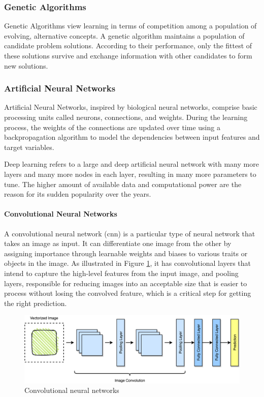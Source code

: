 \subsubsection{Genetic Algorithms}

Genetic Algorithms view learning in terms of competition among a population of evolving, alternative concepts. A genetic algorithm maintains a population of candidate problem solutions. According to their performance, only the fittest of these solutions survive and exchange information with other candidates to form new solutions.

\subsubsection{Artificial Neural Networks}

Artificial Neural Networks, inspired by biological neural networks, comprise basic processing units called neurons, connections, and weights. During the learning process, the weights of the connections are updated over time using a backpropagation algorithm to model the dependencies between input features and target variables.

Deep learning refers to a large and deep artificial neural network with many more layers and many more nodes in each layer, resulting in many more parameters to tune.
The higher amount of available data and computational power are the reason for its sudden popularity over the years.

\paragraph{Convolutional Neural Networks}

A convolutional neural network (\gls{cnn}) is a particular type of neural network that takes an image as input. It can differentiate one image from the other by assigning importance through learnable weights and biases to various traits or objects in the image. As illustrated in Figure \ref{fig:convolutional_neural_networks}, it has convolutional layers that intend to capture the high-level features from the input image, and pooling layers, responsible for reducing images into an acceptable size that is easier to process without losing the convolved feature, which is a critical step for getting the right prediction.

\begin{figure}[H]
\centering
\includegraphics[width=\textwidth]{img/state_of_the_art/convolutional_neural_network.png}
\caption{Convolutional neural networks}
\label{fig:convolutional_neural_networks}
\end{figure}

